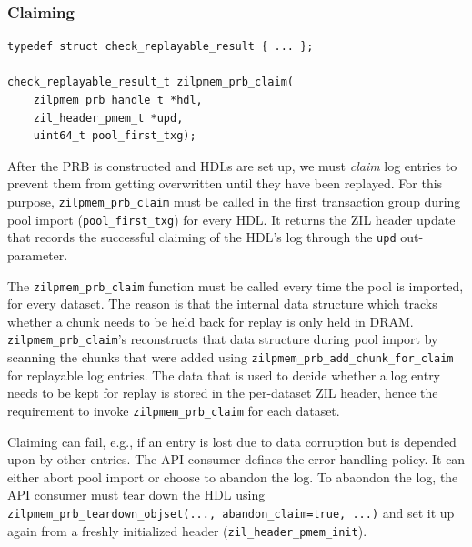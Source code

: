\documentclass[12pt,a4paper,twoside]{book}
\begin{document}
\subsubsection{Claiming}\label{di:prb:api:claiming}

\begin{lstlisting}
typedef struct check_replayable_result { ... };

check_replayable_result_t zilpmem_prb_claim(
    zilpmem_prb_handle_t *hdl,
    zil_header_pmem_t *upd,
    uint64_t pool_first_txg);
\end{lstlisting}

After the PRB is constructed and HDLs are set up, we must \textit{claim} log entries to prevent them from getting overwritten until they have been replayed.
For this purpose, \lstinline{zilpmem_prb_claim} must be called in the first transaction group during pool import (\lstinline{pool_first_txg}) for every HDL.
It returns the ZIL header update that records the successful claiming of the HDL's log through the \lstinline{upd} out-parameter.

The \lstinline{zilpmem_prb_claim} function must be called every time the pool is imported, for every dataset.
The reason is that the internal data structure which tracks whether a chunk needs to be held back for replay is only held in DRAM.
\lstinline{zilpmem_prb_claim}'s reconstructs that data structure during pool import by scanning the chunks that were added using \lstinline{zilpmem_prb_add_chunk_for_claim} for replayable log entries.
The data that is used to decide whether a log entry needs to be kept for replay is stored in the per-dataset ZIL header, hence the requirement to invoke \lstinline{zilpmem_prb_claim} for each dataset.

Claiming can fail, e.g., if an entry is lost due to data corruption but is depended upon by other entries.
The API consumer defines the error handling policy.
It can either abort pool import or choose to abandon the log.
To abaondon the log, the API consumer must tear down the HDL using \lstinline{zilpmem_prb_teardown_objset(..., abandon_claim=true, ...)} and set it up again from a freshly initialized header (\lstinline{zil_header_pmem_init}).
\end{document}
